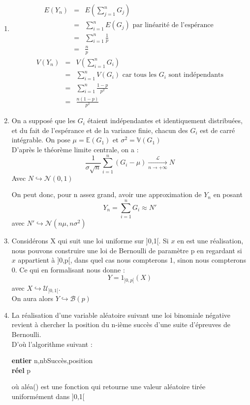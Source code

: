 \documentclass{article}
\begin{document}
\begin{enumerate}
\item \begin{eqnarray*}
E(Y_n)&=&E\left(\sum_{j=1}^n G_j\right) \\
      &=&\sum_{i=1}^n E(G_j) \text{ par linéarité de l'espérance }\\
      &=&\sum_{i=1}^n \frac{1}{p} \\
      &=&\frac{n}{p}
\end{eqnarray*}
\begin{eqnarray*}
V(Y_n)&=&V\left(\sum_{i=1}^n G_i\right) \\
      &=&\sum_{i=1}^n V(G_i) \text{ car tous les } G_i \text{ sont indépendants} \\
      &=& \sum_{i=1}^n \frac{1-p}{p^2} \\
      &=& \frac{n(1-p)}{p^2}
\end{eqnarray*}

\item On a supposé que les $G_i$ étaient indépendantes et identiquement distribuées, et du fait de l'espérance et de la variance finie, chacun des $G_i$ est de carré intégrable. On pose $\mu=\mathbb{E}(G_1)$ et $\sigma^2=\mathbb{V}(G_1)$ \\
D'après le théorème limite centrale, on a :
\[\frac{1}{\sigma \sqrt{n}}\sum_{i=1}^n (G_i-\mu) \xrightarrow[n\to+\infty]{\mathcal{L}} N\]
Avec $N\hookrightarrow \mathcal{N}(0,1)$

\bigskip
On peut donc, pour n assez grand, avoir une approximation de $Y_n$ en posant
\[Y_n=\sum_{i=1}^n G_i \approx N'\]
avec $N'\hookrightarrow \mathcal{N}(n\mu,n\sigma^2)$

\item Considérons X qui suit une loi uniforme sur ]0,1[. Si $x$ en est une réalisation, nous pouvons construire une loi de Bernoulli de paramètre p en regardant si $x$ appartient à ]0,p[, dans quel cas nous compterons 1, sinon nous compterons 0. Ce qui en formalisant nous donne : 
		\[Y=1_{]0,p[}(X)\]
avec $X\hookrightarrow \mathcal{U}_{]0,1[}$.\\ On aura alors $Y\hookrightarrow \mathcal{B}(p)$

\item La réalisation d'une variable aléatoire suivant une loi binomiale négative revient à chercher la position du n-ième succès d'une suite d'épreuves de Bernoulli. \\
D'où l'algorithme suivant :\\ 
\begin{algorithm}[H]
	\textbf{entier} n,nbSuccès,position\\
	\textbf{réel} p\\
\end{algorithm}
où aléa() est une fonction qui retourne une valeur aléatoire tirée uniformément dans ]0,1[

\end{enumerate}
\end{document}
